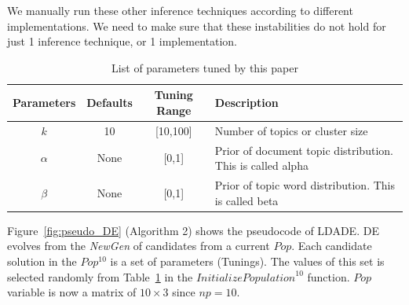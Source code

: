 \documentclass[twocolumn,5p,sort&compress]{elsarticle}
\newcommand{\fig}[1]{Figure~\ref{fig:#1}}
\theoremstyle{break}
\begin{document}
We manually run these other inference techniques according to different implementations. We need to make sure that these instabilities do not hold for just 1 inference technique, or 1 implementation.

\begin{table}[!htbp]
\begin{center}
\scriptsize
\caption{List of parameters tuned by this paper}
\label{tb:tuned}
\begin{tabular}{|c|c|c|p{3.5cm}|}
        \hline 
        \textbf{Parameters} & \textbf{Defaults} & \textbf{Tuning Range} & \textbf{Description}\\
        \hline
        $k$ & 10 & [10,100] & Number of topics or cluster size \\ 
        \hline
       $\alpha$ & None & [0,1] & Prior of document topic distribution. This is called alpha \\ 
        \hline
        $\beta$ & None & [0,1] & Prior of topic word distribution. This is called  beta \\

        \hline
\end{tabular}
\end{center}
\end{table}

\fig{pseudo_DE} (Algorithm 2) shows the pseudocode of LDADE. DE evolves from the \textit{NewGen} of
candidates from a current $Pop$. Each candidate solution in the $Pop^{10}$ is a set of  parameters (Tunings). The values of this set is selected randomly from Table~\ref{tb:tuned} in the $\mathit{InitializePopulation}^{10}$ function. $Pop$ variable is now a matrix of $10\times3$ since $np=10$.
\end{document}
